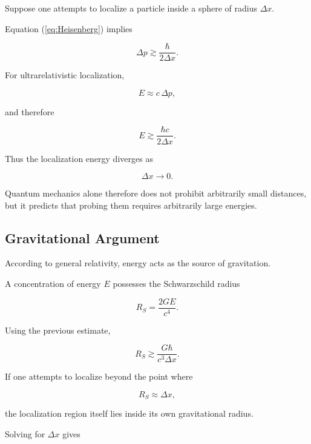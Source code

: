 Suppose one attempts to localize a particle inside a sphere of radius
$\Delta x$.

Equation (\ref{eq:Heisenberg}) implies

\begin{equation}
\Delta p
\gtrsim
\frac{\hbar}{2\Delta x}.
\end{equation}

For ultrarelativistic localization,

\begin{equation}
E
\approx
c\,\Delta p,
\end{equation}

and therefore

\begin{equation}
E
\gtrsim
\frac{\hbar c}{2\Delta x}.
\end{equation}

Thus the localization energy diverges as

\[
\Delta x\rightarrow0.
\]

Quantum mechanics alone therefore does not prohibit arbitrarily small
distances, but it predicts that probing them requires arbitrarily large
energies.


\subsection{Gravitational Argument}

According to general relativity, energy acts as the source of gravitation.

A concentration of energy $E$ possesses the Schwarzschild radius

\begin{equation}
R_S
=
\frac{2GE}{c^4}.
\end{equation}

Using the previous estimate,

\begin{equation}
R_S
\gtrsim
\frac{G\hbar}
{c^3\Delta x}.
\end{equation}

If one attempts to localize beyond the point where

\[
R_S
\approx
\Delta x,
\]

the localization region itself lies inside its own gravitational radius.

Solving for $\Delta x$ gives

